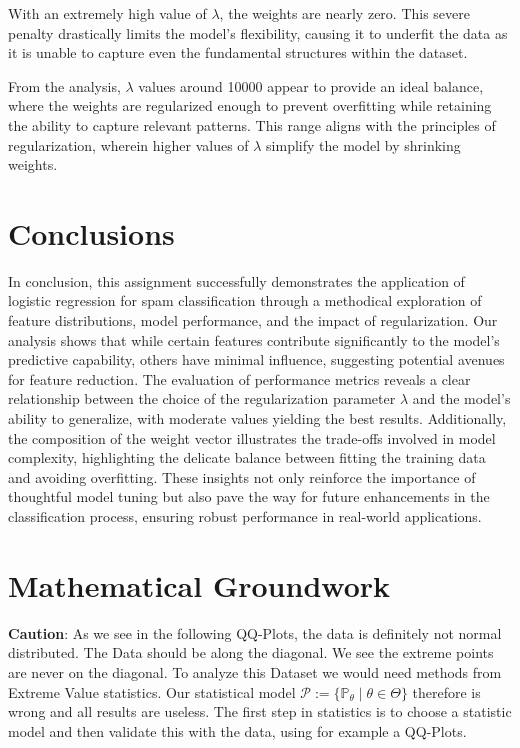 \documentclass[a4paper,oneside,bibliography=totoc]{scrartcl}
\begin{document}
With an extremely high value of $\lambda$, the weights are nearly zero. This severe penalty drastically limits the model's flexibility, causing it to underfit the data as it is unable to capture even the fundamental structures within the dataset.

From the analysis, $\lambda$ values around 10000 appear to provide an ideal balance, where the weights are regularized enough to prevent overfitting while retaining the ability to capture relevant patterns. This range aligns with the principles of regularization, wherein higher values of $\lambda$ simplify the model by shrinking weights.

\section{Conclusions}
In conclusion, this assignment successfully demonstrates the application of logistic regression for spam classification through a methodical exploration of feature distributions, model performance, and the impact of regularization. Our analysis shows that while certain features contribute significantly to the model’s predictive capability, others have minimal influence, suggesting potential avenues for feature reduction. The evaluation of performance metrics reveals a clear relationship between the choice of the regularization parameter $\lambda$ and the model’s ability to generalize, with moderate values yielding the best results. Additionally, the composition of the weight vector illustrates the trade-offs involved in model complexity, highlighting the delicate balance between fitting the training data and avoiding overfitting. These insights not only reinforce the importance of thoughtful model tuning but also pave the way for future enhancements in the classification process, ensuring robust performance in real-world applications.





\appendix
\section{Mathematical Groundwork}
\label{intro}

\textbf{Caution}: As we see in the following QQ-Plots, the data is definitely not normal distributed. The Data should be along the diagonal. We see the extreme points are never on the diagonal. To analyze this Dataset we would need methods from Extreme Value statistics. Our statistical model $\mathcal{P}:= \{ \mathbb{P}_\theta \mid \theta \in \Theta \}$ therefore is wrong and all results are useless. The first step in statistics is to choose a statistic model and then validate this with the data, using for example a QQ-Plots.
\end{document}
